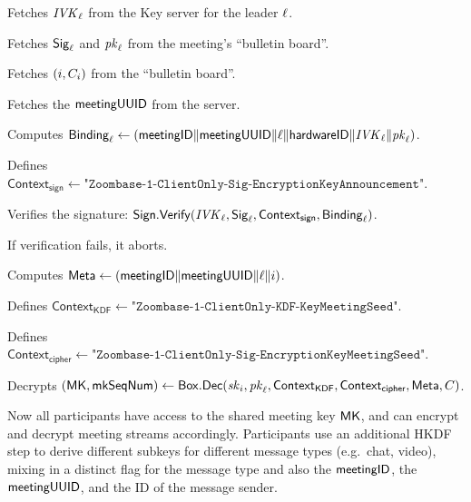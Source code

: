 \begingroup
\RaggedRight
\begin{enumerate*}
\item Fetches $\mathit{IVK}_{\ell}$ from the Key server for the leader $\ell$.
\item Fetches ${\sf Sig}_{\ell}$ and $\mathit{pk}_\ell$ from the meeting's ``bulletin board''.
\item Fetches $(i, C_i)$ from the ``bulletin board''.
\item Fetches the ${\sf meetingUUID}$ from the server.
\item Computes ${\sf Binding}_\ell \leftarrow \left( {\sf meetingID} \| \allowbreak {\sf meetingUUID} \| \ell \allowbreak \| {\sf hardwareID} \| \mathit{IVK}_\ell \| \allowbreak \mathit{pk}_\ell \right)$.
\item Defines $\textsf{Context}_\textsf{sign} \leftarrow \texttt{"Zoombase-1-ClientOnly-Sig-EncryptionKeyAnnouncement"}$.
\item Verifies the signature: ${\sf Sign}.\mathsf{Verify}(\mathit{IVK}_{\ell}, {\sf Sig}_\ell, \textsf{Context}_\textsf{sign}, {\sf Binding}_\ell)$.
\item If verification fails, it aborts.
\item Computes ${\sf Meta} \leftarrow \left({\sf meetingID} \| \allowbreak {\sf meetingUUID} \| \allowbreak \ell \| i \right)$.
\item Defines $\textsf{Context}_\textsf{KDF} \leftarrow \texttt{"Zoombase-1-ClientOnly-KDF-KeyMeetingSeed"}$.
\item Defines $\textsf{Context}_\textsf{cipher} \leftarrow \texttt{"Zoombase-1-ClientOnly-Sig-EncryptionKeyMeetingSeed"}$.
\item Decrypts $({\sf MK}, \mathsf{mkSeqNum}) \leftarrow {\sf Box}.\mathsf{Dec}(\mathit{sk}_{i}, \mathit{pk}_{\ell}, \textsf{Context}_\textsf{KDF}, \textsf{Context}_\textsf{cipher}, {\sf Meta}, C)$.
   \label{participantJoinRekeyNonLeader}
\end{enumerate*}
\endgroup

Now all participants have access to the shared meeting key ${\sf MK}$, and can
encrypt and decrypt meeting streams accordingly. Participants use an additional
HKDF step to derive different subkeys for different message types (e.g.\ chat,
video), mixing in a distinct flag for the message type and also the
${\sf meetingID}$, the ${\sf meetingUUID}$, and the ID of the message sender.
